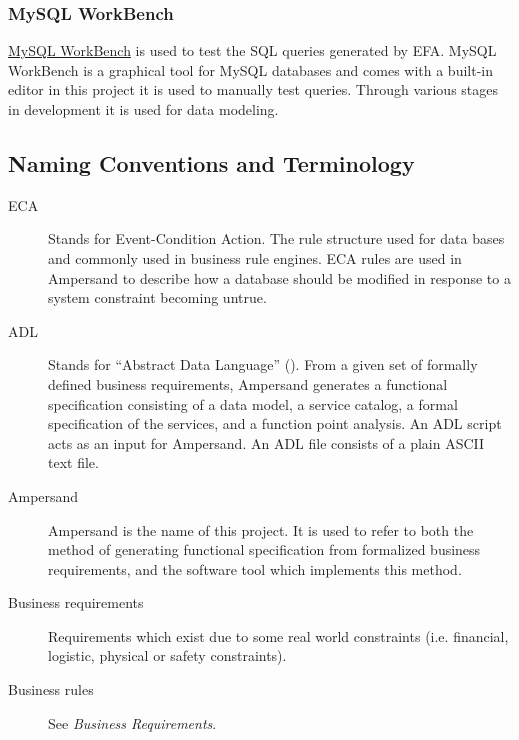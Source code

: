 \documentclass[journal,12pt,onecolumn,draftclsnofoot]{article}
\let\Oldsubsection\subsection
\renewcommand{\subsection}{\FloatBarrier\Oldsubsection}
\let\Oldsubsubsection\subsubsection
\renewcommand{\subsubsection}{\FloatBarrier\Oldsubsubsection}
\begin{document}
\subsubsection*{MySQL WorkBench}
\noindent
\href{https://dev.mysql.com/doc/workbench/en/}{MySQL WorkBench} is used to test 
the SQL queries generated by EFA. MySQL WorkBench is a graphical tool for MySQL 
databases and comes with a built-in editor in this project it is used to 
manually test queries. Through various stages in development it is used for 
data modeling.

\subsection{Naming Conventions and Terminology}\label{sec:Naming} 
\begin{description}
    \item[ECA] Stands for Event-Condition Action. The rule structure used for 
    data
    bases and commonly used in  business rule engines. ECA rules are
    used in Ampersand to describe how a database should be modified in response 
    to
    a system constraint becoming untrue. 
    
    \item [ADL] Stands for ``Abstract Data Language''
      (\cite[13]{derFun}).
    From a given set of formally defined business requirements, Ampersand generates a
    functional specification consisting of a data model, a service catalog, a
    formal specification of the services, and a function point analysis. An ADL
    script acts as an input for Ampersand. An ADL file consists of a plain ASCII
    text file.
    
    \item [Ampersand] Ampersand is the name of this project.
    It is used to refer to
    both the method of generating functional specification from formalized
    business requirements, and the software tool which implements this method.
    
    \item [Business requirements] Requirements which exist due to some real 
    world 
    constraints (i.e. financial, logistic, physical or safety constraints). 
    
    \item [Business rules] See \emph{Business Requirements}.
    

\end{description}
\end{document}
